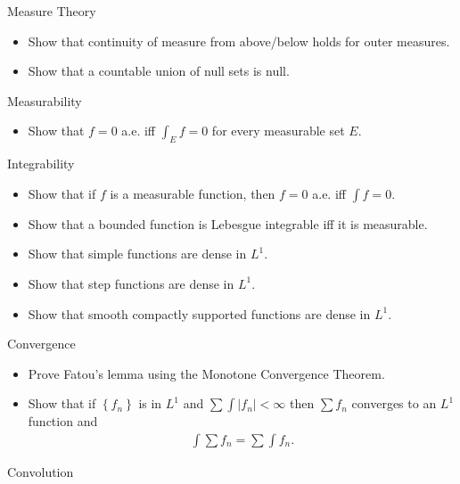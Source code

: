 Measure Theory

\begin{itemize}
\item
  Show that continuity of measure from above/below holds for outer
  measures.
\item
  Show that a countable union of null sets is null.
\end{itemize}

Measurability

\begin{itemize}
\tightlist
\item
  Show that \(f=0\) a.e. iff \(\int_E f = 0\) for every measurable set
  \(E\).
\end{itemize}

Integrability

\begin{itemize}
\tightlist
\item
  Show that if \(f\) is a measurable function, then \(f=0\) a.e. iff
  \(\int f = 0\).
\item
  Show that a bounded function is Lebesgue integrable iff it is
  measurable.
\item
  Show that simple functions are dense in \(L^1\).
\item
  Show that step functions are dense in \(L^1\).
\item
  Show that smooth compactly supported functions are dense in \(L^1\).
\end{itemize}

Convergence

\begin{itemize}
\tightlist
\item
  Prove Fatou's lemma using the Monotone Convergence Theorem.
\item
  Show that if \(\left\{{f_n}\right\}\) is in \(L^1\) and
  \(\sum \int {\left\lvert {f_n} \right\rvert} < \infty\) then
  \(\sum f_n\) converges to an \(L^1\) function and
  \begin{align*}\int \sum f_n = \sum \int f_n.\end{align*}
\end{itemize}

Convolution

